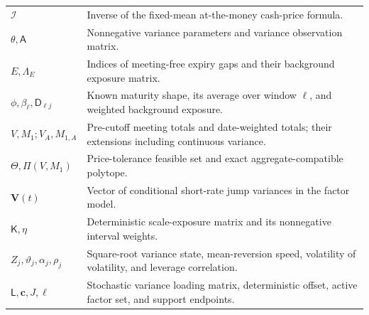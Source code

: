 \begin{longtable}{p{}p{}}
$\mathcal I$ & Inverse of the fixed-mean at-the-money cash-price formula.\\
$\theta,\mathsf A$ & Nonnegative variance parameters and variance observation matrix.\\
$E,\Lambda_E$ & Indices of meeting-free expiry gaps and their background exposure matrix.\\
$\phi,\beta_\ell,\mathsf D_{\ell j}$ & Known maturity shape, its average over window $\ell$, and weighted background exposure.\\
$V,M_1;V_A,M_{1,A}$ & Pre-cutoff meeting totals and date-weighted totals; their extensions including continuous variance.\\
$\Theta,\Pi(V,M_1)$ & Price-tolerance feasible set and exact aggregate-compatible polytope.\\
$\boldsymbol V(t)$ & Vector of conditional short-rate jump variances in the factor model.\\
$\mathsf K,\eta$ & Deterministic scale-exposure matrix and its nonnegative interval weights.\\
$Z_j,\vartheta_j,\alpha_j,\rho_j$ & Square-root variance state, mean-reversion speed, volatility of volatility, and leverage correlation.\\
$\mathsf L,\boldsymbol c,J,\ell$ & Stochastic variance loading matrix, deterministic offset, active factor set, and support endpoints.\\
\bottomrule
\end{longtable}
